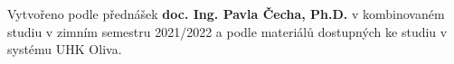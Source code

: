 \epigraph{Vytvořeno podle přednášek \textbf{doc. Ing. Pavla Čecha, Ph.D.} v kombinovaném studiu v zimním semestru 2021/2022 a podle materiálů dostupných ke studiu v systému UHK Oliva.}{}

